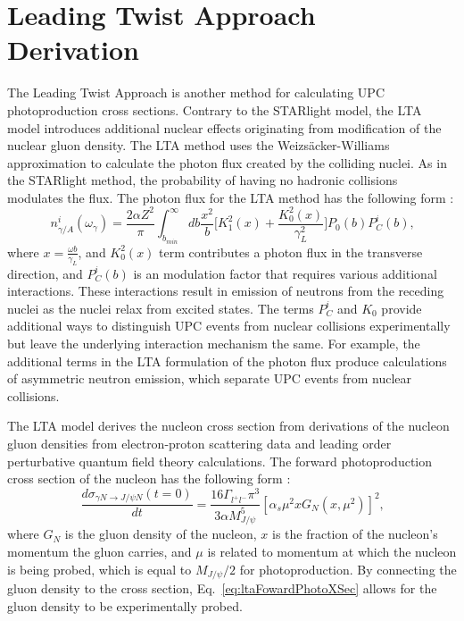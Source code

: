   \section{\label{sec:ltaTheory}Leading Twist Approach Derivation}
    The Leading Twist Approach is another method for calculating UPC 
      photoproduction cross sections. 
    Contrary to the STARlight model, the LTA model introduces additional 
      nuclear effects originating from modification of the nuclear gluon
      density. 
    The LTA method uses the Weizs\"{a}cker-Williams approximation to calculate 
      the photon flux created by the colliding nuclei. 
    As in the STARlight method, the probability of having no hadronic collisions 
      modulates the flux.
    The photon flux for the LTA method has the following form \cite{lta2011.09}:
    \begin{equation} \label{eq:ltaPhotonFlux}
      n_{\gamma/A}^{i}(\omega_{\gamma})=\frac{2\alpha Z^{2}}{\pi}\int_{b_{min}}^{\infty}
        db\frac{x^{2}}{b}\Big[K_{1}^{2}(x)+\frac{K_{0}^{2}(x)}{\gamma_{L}^{2}}\Big]
        P_{0}(b)P_{C}^{i}(b)\textrm{,} 
    \end{equation}
    where $x=\frac{\omega b}{\gamma_{L}}$, and $K_{0}^{2}(x)$ term contributes 
      a photon flux in the transverse direction, and $P_{C}^{i}(b)$ is an 
      modulation factor that requires various additional interactions. 
    These interactions result in emission of neutrons from the 
      receding nuclei as the nuclei relax from excited states. 
    The terms $P_{C}^{i}$ and $K_{0}$ provide additional ways to distinguish UPC
      events from nuclear collisions experimentally but leave the underlying 
      interaction mechanism the same. 
    For example, the additional terms in the LTA formulation of the photon flux
      produce calculations of asymmetric neutron emission, which separate UPC 
      events from nuclear collisions.  

    The LTA model derives the nucleon cross section from derivations
     of the nucleon gluon densities from electron-proton scattering data and
     leading order perturbative quantum field theory calculations.
    The forward photoproduction cross section of the nucleon has the following
     form \cite{lta2011.09}:
   \begin{equation} \label{eq:ltaFowardPhotoXSec}
     \frac{d\sigma_{\gamma N\rightarrow J/\psi N}(t=0)}{dt}=\frac{16\Gamma_{l^{+}l^{-}}\pi^{3}}
     {3\alpha M_{J/\psi}^{5}}[\alpha_{s}\mu^{2}xG_{N}(x,\mu^{2})]^{2}\textrm{,}
   \end{equation}
     where $G_{N}$ is the gluon density of the nucleon, $x$ is the fraction of
     the nucleon's momentum the gluon carries, and $\mu$ is related
     to momentum at which the nucleon is being probed, which is equal to 
     $M_{J/\psi}/2$ for \JPsi{} photoproduction.
   By connecting the gluon density to the cross section, Eq.~\ref{eq:ltaFowardPhotoXSec}
     allows for the gluon density to be experimentally probed. 

